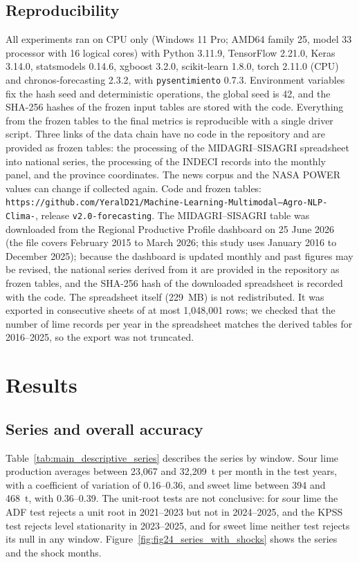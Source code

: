 \documentclass[forecasting,article,submit,moreauthors]{Definitions/mdpi}
\begin{document}
\subsection{Reproducibility}
All experiments ran on CPU only (Windows 11 Pro; AMD64 family 25, model 33 processor with 16 logical cores) with Python 3.11.9, TensorFlow 2.21.0, Keras 3.14.0, statsmodels 0.14.6, xgboost 3.2.0, scikit-learn 1.8.0, torch 2.11.0 (CPU) and chronos-forecasting 2.3.2, with \texttt{pysentimiento} 0.7.3. Environment variables fix the hash seed and deterministic operations, the global seed is 42, and the SHA-256 hashes of the frozen input tables are stored with the code. Everything from the frozen tables to the final metrics is reproducible with a single driver script. Three links of the data chain have no code in the repository and are provided as frozen tables: the processing of the MIDAGRI--SISAGRI spreadsheet into national series, the processing of the INDECI records into the monthly panel, and the province coordinates. The news corpus and the NASA POWER values can change if collected again. Code and frozen tables: \texttt{https://github.com/YeralD21/Machine-Learning-Multimodal--Agro-NLP-Clima-}, release \texttt{v2.0-forecasting}. The MIDAGRI--SISAGRI table was downloaded from the Regional Productive Profile dashboard on 25 June 2026 (the file covers February 2015 to March 2026; this study uses January 2016 to December 2025); because the dashboard is updated monthly and past figures may be revised, the national series derived from it are provided in the repository as frozen tables, and the SHA-256 hash of the downloaded spreadsheet is recorded with the code. The spreadsheet itself (229~MB) is not redistributed. It was exported in consecutive sheets of at most 1,048,001 rows; we checked that the number of lime records per year in the spreadsheet matches the derived tables for 2016--2025, so the export was not truncated.


\section{Results}

\subsection{Series and overall accuracy}
Table~\ref{tab:main_descriptive_series} describes the series by window. Sour lime production averages between 23,067 and 32,209~t per month in the test years, with a coefficient of variation of 0.16--0.36, and sweet lime between 394 and 468~t, with 0.36--0.39. The unit-root tests are not conclusive: for sour lime the ADF test rejects a unit root in 2021--2023 but not in 2024--2025, and the KPSS test rejects level stationarity in 2023--2025, and for sweet lime neither test rejects its null in any window. Figure~\ref{fig:fig24_series_with_shocks} shows the series and the shock months.
\end{document}
